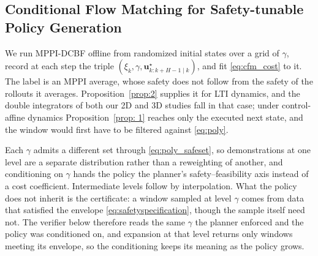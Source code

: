 \documentclass[letterpaper, 10 pt, conference]{ieeeconf}
\begin{document}

\subsection{Conditional Flow Matching for Safety-tunable Policy Generation}

{\color{blue}
We run MPPI-DCBF offline from randomized initial states over a grid of $\gamma$, record at each step the triple $(\xi_k,\gamma,\mathbf u^\star_{k:k+H-1\mid k})$, and fit \eqref{eq:cfm_cost} to it. The label is an MPPI average, whose safety does not follow from the safety of the rollouts it averages. Proposition~\ref{prop:2} supplies it for LTI dynamics, and the double integrators of both our 2D and 3D studies fall in that case; under control-affine dynamics Proposition~\ref{prop: 1} reaches only the executed next state, and the window would first have to be filtered against \eqref{eq:poly}.
}

{\color{blue}
Each $\gamma$ admits a different set through \eqref{eq:poly_safeset}, so demonstrations at one level are a separate distribution rather than a reweighting of another, and conditioning on $\gamma$ hands the policy the planner's safety--feasibility axis instead of a cost coefficient. Intermediate levels follow by interpolation. What the policy does not inherit is the certificate: a window sampled at level $\gamma$ comes from data that satisfied the envelope \eqref{eq:safetyspecification}, though the sample itself need not. The verifier below therefore reads the same $\gamma$ the planner enforced and the policy was conditioned on, and expansion at that level returns only windows meeting its envelope, so the conditioning keeps its meaning as the policy grows.
}
\end{document}
